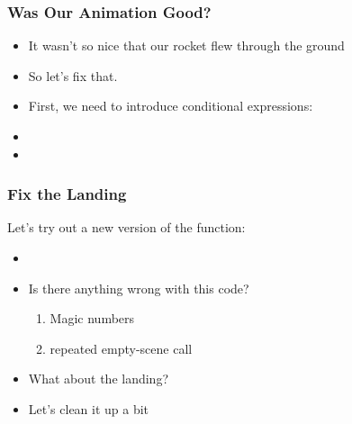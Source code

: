 \documentclass{beamer}
\begin{document}


\begin{frame}
  \frametitle{Was Our Animation Good?}
  \begin{itemize}
  \item<1-> It wasn't so nice that our rocket flew through the ground
  \item<2-> So let's fix that.
  \item<3-> First, we need to introduce conditional expressions:
  \item<4-> \sign
  \item<5-> \signJava
  \end{itemize}
\end{frame}


\begin{frame}
  \frametitle{Fix the Landing}
  Let's try out a new version of the function:
  \begin{itemize}
  \item<1-> \versionTwo
  \item<2-> Is there anything wrong with this code?
    \begin{enumerate}
    \item<3-> Magic numbers
    \item<4-> repeated empty-scene call
    \end{enumerate}
  \item<5-> What about the landing?
  \item<6-> Let's clean it up a bit
  \end{itemize}
\end{frame}
\end{document}
